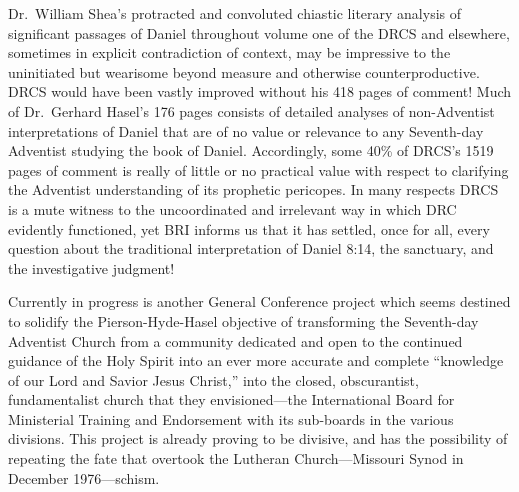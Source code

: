 Dr.\ William Shea's protracted and convoluted chiastic literary analysis of
significant passages of Daniel throughout volume one of the DRCS and
elsewhere, sometimes in explicit contradiction of context, may be impressive
to the uninitiated but wearisome beyond measure and otherwise
counterproductive. DRCS would have been vastly improved without his 418
pages of comment! Much of Dr.\ Gerhard Hasel's 176 pages consists of
detailed analyses of non-Adventist interpretations of Daniel that are of no
value or relevance to any Seventh-day Adventist studying the book of Daniel.
Accordingly, some 40\% of DRCS's 1519 pages of comment is really of little or
no practical value with respect to clarifying the Adventist understanding of
its prophetic pericopes. In many respects DRCS is a mute witness to the
uncoordinated and irrelevant way in which DRC evidently functioned, yet BRI
informs us that it has settled, once for all, every question about the
traditional interpretation of Daniel 8:14, the sanctuary, and the
investigative judgment!

Currently in progress is another General Conference project which seems
destined to solidify the Pierson-Hyde-Hasel objective of transforming the
Seventh-day Adventist Church from a community dedicated and open to the
continued guidance of the Holy Spirit into an ever more accurate and
complete ``knowledge of our Lord and Savior Jesus Christ,'' into the
closed, obscurantist, fundamentalist church that they envisioned---the
International Board for Ministerial Training and Endorsement with its
sub-boards in the various divisions. This project is already proving to be
divisive, and has the possibility of repeating the fate that overtook the
Lutheran Church---Missouri Synod in December 1976---schism.
